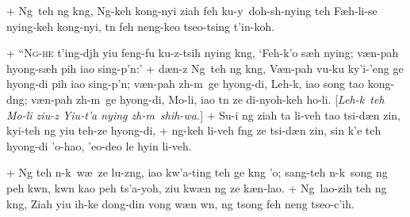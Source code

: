 +	Ng\oo\ teh ng k\oo ng, Ng-keh kong-nyi ziah feh ku-y\y\ doh-sh\y-nying teh F\ae h-li-se nying-keh kong-nyi,
	t\e n feh neng-keo tseo-tsing t'in-koh.
\par
+	``\textsc{Ng-he} t'ing-dj\oo h yiu feng-fu ku-z-tsih nying k\oo ng, `Feh-k'o s\ae h nying; v\ae n-pah hy\y ong-s\ae h
	pih iao sing-p'\e n:'
+	d\ae n-z Ng\oo\ teh ng k\oo ng, V\ae n-pah vu-ku ky'i-'eng ge hy\y ong-di pih iao sing-p'\e n; v\ae n-pah z\oo h-m\oo\
	ge hy\y ong-di, Leh-k\oo, iao song tao kong-d\oo ng; v\ae n-pah z\oo h-m\oo\ ge hy\y ong-di, Mo-li, iao t\e n ze
	di-ny\y oh-keh ho-li. [\textit{Leh-k\oo\ teh Mo-li ziu-z Yiu-t'a nying z\oo h-m\oo\ shih-wa.}]
+	Su-i ng ziah ta li-veh tao tsi-d\ae n zin, kyi-teh ng yiu teh-ze hy\y ong-di,
+	ng-keh li-veh f\oo ng ze tsi-d\ae n zin, sin k'e teh hy\y ong-di 'o-hao, 'eo-deo le hyin li-veh.
\par
+	Ng teh \y n-k\oo\ w\ae\ ze lu-z\oo ng, iao kw'a-ting teh ge k\oo ng 'o; sang-teh \y n-k\oo\ song ng peh kw\e n,
	kw\e n kao peh ts'a-y\y oh, ziu kw\ae n ng ze k\ae n-lao.
+	Ng\oo\ lao-zih teh ng k\oo ng, Ziah yiu ih-ke dong-din vong w\ae n w\e n, ng tsong feh neng tseo-c'ih.